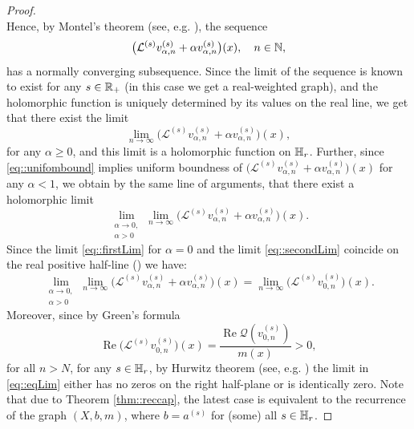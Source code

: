 \documentclass[a4paper,11pt]{amsart}
\theoremstyle{definition}
\renewcommand{\Re}{\operatorname{Re}}%
\renewcommand{\L}{\mathcal{L}}
\newcommand{\Q}{\mathcal{Q}}
\newcommand{\cfreq}{s}
\begin{document}
\begin{proof}
$$$$
Hence, by Montel's theorem (see, e.g. \cite[p. 153]{Conway}), the sequence 
$$
\big(\L^{(\cfreq)}   v_{\alpha,n}^{(\cfreq)}+\alpha  v_{\alpha,n}^{(\cfreq)}\big)(x), \quad n\in \Bbb N,
$$
has a normally converging subsequence. Since the limit of the sequence is known to exist for any $s\in \Bbb R_+$ (in this case we get a real-weighted graph), and the holomorphic function is uniquely determined by its values on the real line, we get that there exist the limit 
\begin{equation}\label{eq::firstLim}
\lim_{n\to \infty}\big(\L^{(\cfreq)}   v_{\alpha,n}^{(\cfreq)}+\alpha  v_{\alpha,n}^{(\cfreq)}\big)(x),
\end{equation} 
for any $\alpha\ge 0$, and this limit is a holomorphic function on $\Bbb H_r$.  
Further, since \eqref{eq::unifombound} implies uniform boundness of $\big(\L^{(\cfreq)}   v_{\alpha,n}^{(\cfreq)}+\alpha  v_{\alpha,n}^{(\cfreq)}\big)(x)$ for any $\alpha<1$, we obtain by the same line of arguments, that there exist a holomorphic limit
\begin{equation}\label{eq::secondLim}
\lim_{\substack{\alpha\to 0,\\\alpha>0}}\lim_{n\to\infty}\big(\L^{(\cfreq)}   v_{\alpha,n}^{(\cfreq)}+\alpha  v_{\alpha,n}^{(\cfreq)}\big)(x). 
\end{equation} 
Since the limit \eqref{eq::firstLim} for $\alpha=0$ and the limit \eqref{eq::secondLim} coincide on the real positive half-line (\cite[Theorem 6.26]{KellerLenzWojcBook}) we have:
\begin{equation}\label{eq::eqLim}\lim_{\substack{\alpha\to 0,\\\alpha>0}}\lim_{n\to\infty}\big(\L^{(\cfreq)}   v_{\alpha,n}^{(\cfreq)}+\alpha  v_{\alpha,n}^{(\cfreq)}\big)(x)=\lim_{n\to\infty}\big(\L^{(\cfreq)}   v_{0,n}^{(\cfreq)}\big)(x).
\end{equation} 
Moreover, since by Green's formula
$$
\Re \big(\L^{(\cfreq)}   v_{0,n}^{(\cfreq)}\big)(x)=\dfrac{\Re \Q(v^{(\cfreq)}_{0,n})}{m(x)}>0,
$$
for all $n>N$, for any $s\in\Bbb H_r$, by Hurwitz theorem (see, e.g. \cite[p. 152, 2.6 Corollary]{Conway}) the limit in \eqref{eq::eqLim} either has no zeros on the right half-plane or is identically zero.  Note that due to Theorem \ref{thm::reccap}, the latest case is equivalent to the recurrence of the graph $(X,b,m)$, where $b=a^{(s)}$ for (some) all $s\in \Bbb H_r$.


\end{proof}
\end{document}
